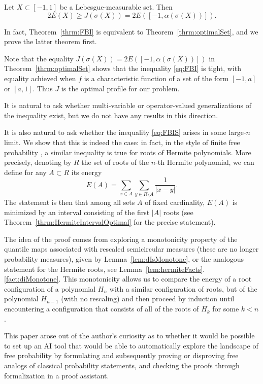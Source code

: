 \begin{theorem} \label{thrm:optimalSet}
   Let $X\subset[-1,1]$ be a Lebesgue-measurable set.  Then \begin{equation}\label{eq:FBIS}
    2 E(X) \geq J(\sigma(X)) = 2E([-1,\alpha(\sigma(X))]).
   \end{equation} 
\end{theorem}

In fact, Theorem~\ref{thrm:FBI} is equivalent to Theorem~\ref{thrm:optimalSet}, and we prove the latter theorem first. 

Note that the equality $J(\sigma(X)) = 2E([-1,\alpha(\sigma(X))])$ in Theorem~\ref{thrm:optimalSet} shows that the inequality  \eqref{eq:FBI} is tight, with equality achieved when $f$ is a characteristic function of a set of the form $[-1,a]$ or $[a,1]$. Thus $J$ is the optimal profile for our problem.

It is natural to ask whether multi-variable or operator-valued generalizations of the inequality exist, but we do not have any results in this direction.

It is also natural to ask whether the inequality \eqref{eq:FBIS} arises in some large-$n$ limit. We show that this is indeed the case: in fact, in the style of finite free probability \cite{MarcusSpeilmanSrivastava}, a similar inequality is true for roots of Hermite polynomials. More precisely, denoting by $R$ the set of roots of the $n$-th Hermite polynomial, we can define for any $A\subset R$ its energy $$E(A)=\sum_{x\in A}\sum_{y\in R\setminus A} \frac{1}{|x-y|}.$$  The statement is then that among all sets $A$ of fixed cardinality, $E(A)$ is minimized by an interval consisting of the first $|A|$ roots (see Theorem~\ref{thrm:HermiteIntervalOptimal} for the precise statement). 

The idea of the proof comes from exploring a monotonicity property of the quantile maps associated with rescaled semicircular measures (these are no longer probability measures), given by Lemma~\ref{lem:dIsMonotone}, or the analogous statement for the Hermite roots, see Lemma~\ref{lem:hermiteFacts}.\ref{fact:diMonotone}.  This monotonicity allows us to compare the energy of a root configuration of a polynomial $H_n$ with a similar configuration of roots, but of the polynomial $H_{n-1}$ (with no rescaling) and then proceed by induction until encountering a configuration that consists of all of the roots of $H_k$ for some $k<n$. 

This paper arose out of the author's curiosity as to whether it would be possible to set up an AI tool that would be able to automatically explore the landscape of free probability by formulating and subsequently proving or disproving free analogs of classical probability statements, and checking the proofs through formalization in a proof assistant. 

